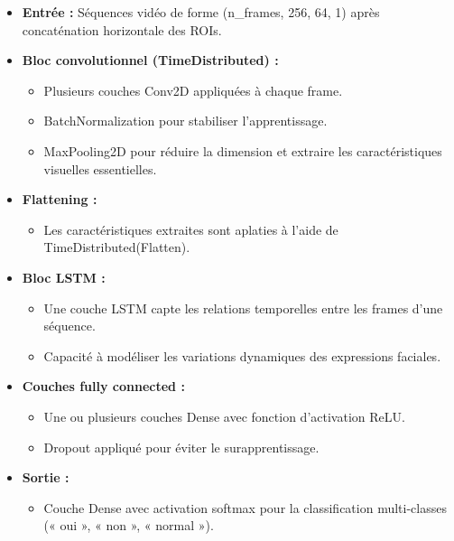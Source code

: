 \documentclass[
]{article}
\begin{document}
\begin{itemize}
\item
  \textbf{Entrée :} Séquences vidéo de forme (n\_frames, 256, 64, 1) après concaténation horizontale des ROIs.
\item
  \textbf{Bloc convolutionnel (TimeDistributed) :\\
  }

  \begin{itemize}
  \item
    Plusieurs couches Conv2D appliquées à chaque frame.
  \item
    BatchNormalization pour stabiliser l'apprentissage.
  \item
    MaxPooling2D pour réduire la dimension et extraire les caractéristiques visuelles essentielles.
  \end{itemize}
\item
  \textbf{Flattening :\\
  }

  \begin{itemize}
  \item
    Les caractéristiques extraites sont aplaties à l'aide de TimeDistributed(Flatten).
  \end{itemize}
\item
  \textbf{Bloc LSTM :\\
  }

  \begin{itemize}
  \item
    Une couche LSTM capte les relations temporelles entre les frames d'une séquence.
  \item
    Capacité à modéliser les variations dynamiques des expressions faciales.
  \end{itemize}
\item
  \textbf{Couches fully connected :\\
  }

  \begin{itemize}
  \item
    Une ou plusieurs couches Dense avec fonction d'activation ReLU.
  \item
    Dropout appliqué pour éviter le surapprentissage.
  \end{itemize}
\item
  \textbf{Sortie :\\
  }

  \begin{itemize}
  \item
    Couche Dense avec activation softmax pour la classification multi-classes (« oui », « non », « normal »).
  \end{itemize}
\end{itemize}
\end{document}
